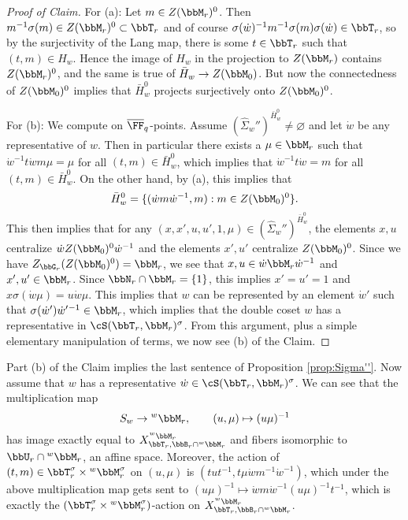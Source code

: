   \begin{proof}[Proof of Claim]
    For (a): Let $m \in Z(\bbM_r)^0$. Then $m^{-1}\sigma(m) \in Z(\bbM_r)^0 \subset \bbT_r$ and of course $\sigma(\dot w)^{-1} m^{-1} \sigma(m) \sigma(\dot w) \in \bbT_r$, so by the surjectivity of the Lang map, there is some $t \in \bbT_r$ such that $(t,m) \in H_w$. Hence the image of $H_w$ in the projection to $Z(\bbM_r)$ contains $Z(\bbM_r)^0$, and the same is true of $\bar H_w \to Z(\bbM_0)$. But now the connectedness of $Z(\bbM_0)^0$ implies that $\bar H_w^0$ projects surjectively onto $Z(\bbM_0)^0$.

    For (b): We compute on $\overline \FF_q$-points. Assume $(\widehat \Sigma_w'')^{\bar H_w^0} \neq \varnothing$ and let $\dot w$ be any representative of $w$. Then in particular there exists a $\mu \in \bbM_r$ such that $\dot w^{-1} t \dot w m \mu = \mu$ for all $(t,m) \in \bar H_w^0$, which implies that $\dot w^{-1} t \dot w = m$ for all $(t,m) \in \bar H_w^0$. On the other hand, by (a), this implies that
    \begin{equation*}
      \bar H_w^0 = \{(\dot w m  \dot w^{-1}, m) : m \in Z(\bbM_0)^0\}.
    \end{equation*}
    This then implies that for any $(x,x',u,u',1,\mu) \in (\widehat \Sigma_w'')^{\bar H_w^0}$, the elements $x,u$ centralize $\dot w Z(\bbM_0)^0 \dot w^{-1}$ and the elements $x',u'$ centralize $Z(\bbM_0)^0$. Since we have $Z_{\bbG_r}(Z(\bbM_0)^0) = \bbM_r$, we see that $x,u \in \dot w \bbM_r \dot w^{-1}$ and $x',u' \in \bbM_r$. Since $\bbN_r \cap \bbM_r = \{1\}$, this implies $x' = u' = 1$ and $x\sigma(\dot w \mu) = u \dot w \mu$. This implies that $w$ can be represented by an element $\dot w'$ such that $\sigma(\dot w')\dot w'{}^{-1} \in \bbM_r$, which implies that the double coset $w$ has a representative in $\cS(\bbT_r, \bbM_r)^\sigma$. From this argument, plus a simple elementary manipulation of terms, we now see (b) of the Claim.
  \end{proof}

  Part (b) of the Claim implies the last sentence of Proposition \ref{prop:Sigma''}. Now assume that $w$ has a representative $\dot w \in \cS(\bbT_r,\bbM_r)^\sigma$. We can see that the multiplication map 
  \begin{equation*}
    S_w \to {}^w \bbM_r, \qquad (u,\mu) \mapsto (u \mu)^{-1}
  \end{equation*}
  has image exactly equal to $X_{\bbT_r,\bbB_r \cap {}^w \bbM_r}^{{}^w \bbM_r}$ and fibers isomorphic to $\bbU_r \cap {}^w \bbM_r$, an affine space. Moreover, the action of $(t,m) \in \bbT_r^\sigma \times {}^w\bbM_r^\sigma$ on $(u,\mu)$ is $(tut^{-1}, t \mu \dot w m^{-1} \dot w^{-1})$, which under the above multiplication map gets sent to $(u \mu)^{-1} \mapsto \dot w m \dot w^{-1} (u \mu)^{-1} t^{-1}$, which is exactly the $(\bbT_r^\sigma \times {}^w \bbM_r^\sigma)$-action on $X_{\bbT_r, \bbB_r \cap {}^w \bbM_r}^{{}^w \bbM_r}$.

